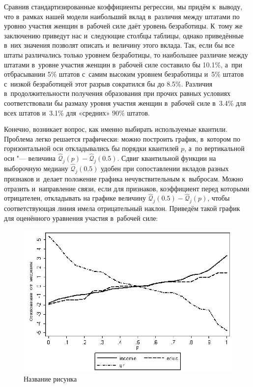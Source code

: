 \documentclass[11pt]{article}
\begin{document}
Сравнив стандартизированные коэффициенты регрессии, мы придём к~выводу, что в~рамках нашей модели наибольший вклад в~различия между штатами по уровню участия женщин в~рабочей силе даёт уровень безработицы. К~тому же заключению приведут нас и~следующие столбцы таблицы, однако приведённые в~них значения позволят описать и~величину этого вклада. Так, если бы все штаты различались только уровнем безработицы, то наибольшее различие между штатами в~уровне участия женщин в~рабочей силе составило бы 10.1\%, а~при отбрасывании 5\% штатов с~самим высоким уровнем безработицы и~5\% штатов с~низкой безработицей этот разрыв сократился бы до 8.5\%. Различия в~продолжительности получения образования при прочих равных условиях соответствовали бы размаху уровня участия женщин в~рабочей силе в~3.4\% для всех штатов и~3.1\% для «средних» 90\% штатов. 

Конечно, возникает вопрос, как именно выбирать используемые квантили. Проблема легко решается графически: можно построить график, в~котором по горизонтальной оси откладывались бы порядки квантилей $p$, а~по вертикальной оси "--- величина $\hat{\mathcal{Q}}_j(p) - \hat{\mathcal{Q}}_j(0.5)$. Сдвиг квантильной функции на выборочную медиану $\hat{\mathcal{Q}}_j(0.5)$ удобен при сопоставлении вкладов разных признаков и~делает положение графика нечувствительным к~выбросам. Можно отразить и~направление связи, если для признаков, коэффициент перед которыми отрицателен, откладывать на графике величину $\hat{\mathcal{Q}}_j(0.5) - \hat{\mathcal{Q}}_j(p)$, чтобы соответствующая линия имела отрицательный наклон. Приведём такой график для оценённого уравнения участия в~рабочей силе:


\begin{figure}[htbp]
	\centering
	\includegraphics[width=12cm]{femalelabor.png}
	\caption{Название рисунка}\label{fig:femalelabor}
\end{figure} 
\end{document}
